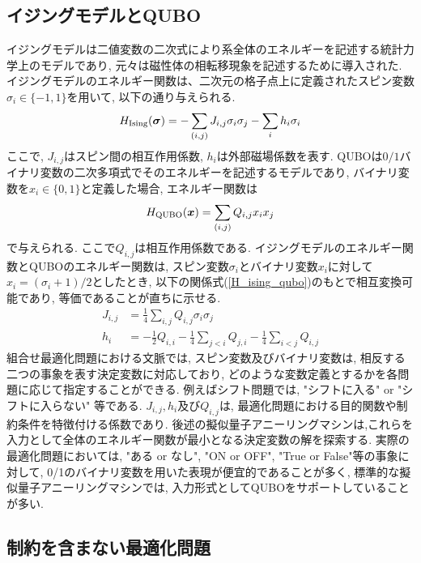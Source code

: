 \documentclass[submit,techrep,noauthor]{ipsj}
\begin{document}
\subsection{イジングモデルとQUBO}
イジングモデルは二値変数の二次式により系全体のエネルギーを記述する統計力学上のモデルであり, 元々は磁性体の相転移現象を記述するために導入された. イジングモデルのエネルギー関数は、二次元の格子点上に定義されたスピン変数$\sigma_{i}\in\{-1, 1\}$を用いて, 以下の通り与えられる.
\begin{equation}
H_{\rm{Ising}}(\bm{\sigma}) = -\sum_{(i,j)} J_{i,j}\sigma_{i}\sigma_{j}
                    -\sum_{i} h_{i}\sigma_{i}
\label{H_ising}
\end{equation}
ここで, $J_{i,j}$はスピン間の相互作用係数, $h_{i}$は外部磁場係数を表す. QUBOは$0/1$バイナリ変数の二次多項式でそのエネルギーを記述するモデルであり, バイナリ変数を$x_{i}\in\{0, 1\}$と定義した場合, エネルギー関数は
\begin{equation}
H_{\rm{QUBO}}(\bm{x}) = \sum_{(i,j)} Q_{i,j}x_{i}x_{j}
\end{equation}
\label{H_qubo}
で与えられる. ここで$Q_{i,j}$は相互作用係数である. イジングモデルのエネルギー関数とQUBOのエネルギー関数は, スピン変数$\sigma_{i}$とバイナリ変数$x_{i}$に対して$x_{i}=(\sigma_{i}+1)/2$としたとき, 以下の関係式(\ref{H_ising_qubo})のもとで相互変換可能であり, 等価であることが直ちに示せる.
\begin{align}
J_{i,j} &= \frac{1}{4}\sum_{i,j}Q_{i,j}\sigma_{i}\sigma_{j}\nonumber\\
h_{i}  &= -\frac{1}{2}Q_{i,i}-\frac{1}{4}\sum_{j<i}Q_{j,i}-\frac{1}{4}\sum_{i<j}Q_{i,j}
\label{H_ising_qubo}
\end{align}
組合せ最適化問題における文脈では, スピン変数及びバイナリ変数は, 相反する二つの事象を表す決定変数に対応しており, どのような変数定義とするかを各問題に応じて指定することができる. 例えばシフト問題では, "シフトに入る" or "シフトに入らない" 等である. $J_{i,j}, h_{i}$及び$Q_{i,j}$は, 最適化問題における目的関数や制約条件を特徴付ける係数であり. 後述の擬似量子アニーリングマシンは,これらを入力として全体のエネルギー関数が最小となる決定変数の解を探索する. 実際の最適化問題においては, "ある or なし", "ON or OFF", "True or False"等の事象に対して, 0/1のバイナリ変数を用いた表現が便宜的であることが多く, 標準的な擬似量子アニーリングマシンでは, 入力形式としてQUBOをサポートしていることが多い.


\subsection{制約を含まない最適化問題}
\end{document}
